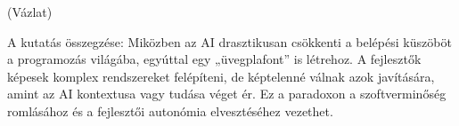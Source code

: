\documentclass[../main.tex]{subfiles}
\begin{document}
(Vázlat)

A kutatás összegzése: Miközben az AI drasztikusan csökkenti a belépési küszöböt a programozás világába, egyúttal egy „üvegplafont” is létrehoz. A fejlesztők képesek komplex rendszereket felépíteni, de képtelenné válnak azok javítására, amint az AI kontextusa vagy tudása véget ér. Ez a paradoxon a szoftverminőség romlásához és a fejlesztői autonómia elvesztéséhez vezethet.
\end{document}
